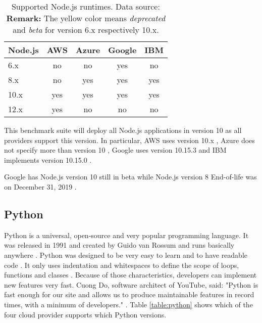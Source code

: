 \begin{table}[htp]
\centering
\captionsetup[table]{justification=centering, labelfont=bf}
\begin{tabular}{|l|c|c|c|c|} 
 \hline
 Node.js & AWS & Azure & Google & IBM \\ \hline
6.x  & \cellcolor{red!25}no    & \cellcolor{red!25}no    & \cellcolor{yellow!25}yes  & \cellcolor{red!25}no\\ \hline
8.x  & \cellcolor{red!25}no & \cellcolor{green!25}yes & \cellcolor{green!25}yes   & \cellcolor{green!25}yes \\ \hline
10.x & \cellcolor{green!25}yes & \cellcolor{green!25}yes & \cellcolor{yellow!25}yes  & \cellcolor{green!25}yes \\ \hline
12.x & \cellcolor{green!25}yes & \cellcolor{red!25}no & \cellcolor{red!25}no & \cellcolor{red!25}no \\ \hline
\end{tabular}
\caption[Supported Node.js runtimes]{Supported Node.js runtimes. Data source: \cite{AWSLambdaLanguages, AzureFunctionsLanguages, GoogleFunctionsLanguages, IBMRuntimes}\\ \textbf{Remark:} The yellow color means \textit{deprecated} and \textit{beta} for version 6.x respectively 10.x.}
\label{table:nodejs}
\end{table}

This benchmark suite will deploy all Node.js applications in version 10 as all providers support this version. In particular, \gls{AWS} uses version 10.x \cite{AWSLambdaLanguages}, Azure does not specify more than version 10 \cite{AzureFunctionsLanguages}, Google uses version 10.15.3 \cite{GoogleFunctionsRuntimes} and \gls{IBM} implements version 10.15.0 \cite{IBMRuntimes}.

\begin{remark}
Google has Node.js version 10 still in beta while Node.js version 8 End-of-life was on December 31, 2019 \cite{NodejsReleases}.
\end{remark}

\subsection{Python}

Python is a universal, open-source and very popular programming language. It was released in 1991 and created by Guido van Rossum \cite{PythonIntro} and runs basically anywhere \cite{PythonAbout}. Python was designed to be very easy to learn and to have readable code \cite{PythonIntro}. It only uses indentation and whitespaces to define the scope of loops, functions and classes \cite{PythonIntro}. Because of those characteristics, developers can implement new features very fast. Cuong Do, software architect of YouTube, said: "Python is fast enough for our site and allows us to produce maintainable features in record times, with a minimum of developers." \cite{PythonQuotes}. Table \ref{table:python} shows which of the four cloud provider supports which Python versions.

